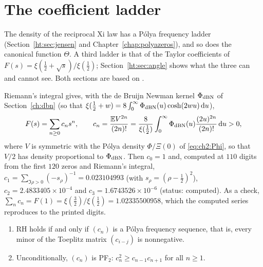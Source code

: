 \section{The coefficient ladder}\label{ht:sec:coef}

The density of the reciprocal Xi law has a P\'olya frequency ladder (Section~\ref{ht:sec:jensen} and Chapter~\ref{chap:polyazeros}), and so does the canonical function $\Theta$. A third ladder is that of the Taylor coefficients of $F(s)=\xi(\frac12+\sqrt s)/\xi(\frac12)$; Section~\ref{ht:sec:angle} shows what the three can and cannot see. Both sections are based on \cite{PolsonResidue26}.

Riemann's integral gives, with the de Bruijn Newman kernel $\Phi_{\rm dBN}$ of Section~\ref{ch:dbn} (so that $\xi(\frac12+w)=8\int_0^\infty\Phi_{\rm dBN}(u)\cosh(2wu)\,\mathrm{d}u$),
\[
F(s)=\sum_{n\ge0}c_ns^n,\qquad c_n=\frac{\mathbb{E} V^{2n}}{(2n)!}=\frac8{\xi(\frac12)}\int_0^\infty\Phi_{\rm dBN}(u)\frac{(2u)^{2n}}{(2n)!}\,\mathrm{d}u>0 ,
\]
where $V$ is symmetric with the P\'olya density $\Phi/\Xi(0)$ of \eqref{eq:ch2:Phi}, so that $V/2$ has density proportional to $\Phi_{\rm dBN}$. Then $c_0=1$ and, computed at $110$ digits from the first $120$ zeros and Riemann's integral, $c_1=\sum_{\Im\rho>0}(-s_\rho)^{-1}=0.023104993$ (with $s_\rho=(\rho-\frac12)^2$), $c_2=2.4833405\times10^{-4}$ and $c_3=1.6743526\times10^{-6}$ (status: computed). As a check, $\sum_nc_n=F(1)=\xi(\frac32)/\xi(\frac12)=1.02335500958$, which the computed series reproduces to the printed digits.

\begin{theorem}\label{ht:thm:coef}
\begin{enumerate}
\item[(i)] RH holds if and only if $(c_n)$ is a P\'olya frequency sequence, that is, every minor of the Toeplitz matrix $(c_{i-j})$ is nonnegative.
\item[(ii)] Unconditionally, $(c_n)$ is PF$_2$: $c_n^2\ge c_{n-1}c_{n+1}$ for all $n\ge1$.
\end{enumerate}
\end{theorem}

